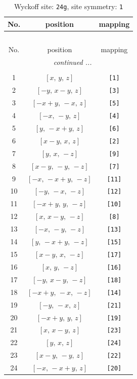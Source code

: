 \documentclass[fleqn,8pt]{jsarticle}
\begin{document}
\begin{longtable}{ccc}
\caption{Wyckoff site: {\tt 24g}, site symmetry: {\tt 1}}
 \\
 \hline \hline
No. & position & mapping \\ \hline \endfirsthead

\multicolumn{2}{l}{\tablename\ \thetable{}} \\
 \hline \hline
No. & position & mapping \\ \hline \endhead

 \hline \hline
\multicolumn{2}{r}{\footnotesize\it continued ...} \\ \endfoot

 \hline \hline
\multicolumn{2}{r}{} \\ \endlastfoot

1 & $\left[ x,\, y,\, z \right]$ & {\tt [1]} \\ \hline
2 & $\left[ - y,\, x - y,\, z \right]$ & {\tt [3]} \\ \hline
3 & $\left[ - x + y,\, - x,\, z \right]$ & {\tt [5]} \\ \hline
4 & $\left[ - x,\, - y,\, z \right]$ & {\tt [4]} \\ \hline
5 & $\left[ y,\, - x + y,\, z \right]$ & {\tt [6]} \\ \hline
6 & $\left[ x - y,\, x,\, z \right]$ & {\tt [2]} \\ \hline
7 & $\left[ y,\, x,\, - z \right]$ & {\tt [9]} \\ \hline
8 & $\left[ x - y,\, - y,\, - z \right]$ & {\tt [7]} \\ \hline
9 & $\left[ - x,\, - x + y,\, - z \right]$ & {\tt [11]} \\ \hline
10 & $\left[ - y,\, - x,\, - z \right]$ & {\tt [12]} \\ \hline
11 & $\left[ - x + y,\, y,\, - z \right]$ & {\tt [10]} \\ \hline
12 & $\left[ x,\, x - y,\, - z \right]$ & {\tt [8]} \\ \hline
13 & $\left[ - x,\, - y,\, - z \right]$ & {\tt [13]} \\ \hline
14 & $\left[ y,\, - x + y,\, - z \right]$ & {\tt [15]} \\ \hline
15 & $\left[ x - y,\, x,\, - z \right]$ & {\tt [17]} \\ \hline
16 & $\left[ x,\, y,\, - z \right]$ & {\tt [16]} \\ \hline
17 & $\left[ - y,\, x - y,\, - z \right]$ & {\tt [18]} \\ \hline
18 & $\left[ - x + y,\, - x,\, - z \right]$ & {\tt [14]} \\ \hline
19 & $\left[ - y,\, - x,\, z \right]$ & {\tt [21]} \\ \hline
20 & $\left[ - x + y,\, y,\, z \right]$ & {\tt [19]} \\ \hline
21 & $\left[ x,\, x - y,\, z \right]$ & {\tt [23]} \\ \hline
22 & $\left[ y,\, x,\, z \right]$ & {\tt [24]} \\ \hline
23 & $\left[ x - y,\, - y,\, z \right]$ & {\tt [22]} \\ \hline
24 & $\left[ - x,\, - x + y,\, z \right]$ & {\tt [20]} \\
\end{longtable}
\end{document}
